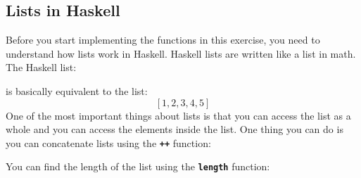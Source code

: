 \subsection{Lists in
Haskell}\label{lab-exercise-3-higher-order-functions.md__lists-in-haskell}

Before you start implementing the functions in this exercise, you need
to understand how lists work in Haskell. Haskell lists are written like
a list in math. The Haskell list:

\begin{Shaded}
\begin{Highlighting}[]
\NormalTok{[}\NormalTok{,}\NormalTok{,}\NormalTok{,}\NormalTok{,}\NormalTok{]}
\end{Highlighting}
\end{Shaded}

is basically equivalent to the list: \[
[1,2,3,4,5]
\] One of the most important things about lists is that you can access
the list as a whole and you can access the elements inside the list. One
thing you can do is you can concatenate lists using the
\textbf{\texttt{++}} function:

\begin{Shaded}
\begin{Highlighting}[]
\OperatorTok{\textgreater{}}\NormalTok{ [}\NormalTok{,}\NormalTok{,}\NormalTok{,}\NormalTok{,}\NormalTok{] }\OperatorTok{++}\NormalTok{ [}\NormalTok{,}\NormalTok{,}\NormalTok{]}
\NormalTok{[}\NormalTok{,}\NormalTok{,}\NormalTok{,}\NormalTok{,}\NormalTok{,}\NormalTok{,}\NormalTok{,}\NormalTok{]}
\end{Highlighting}
\end{Shaded}

You can find the length of the list using the \textbf{\texttt{length}}
function:

\begin{Shaded}
\begin{Highlighting}[]
\OperatorTok{\textgreater{}} \NormalTok{ [}\NormalTok{,}\NormalTok{,}\NormalTok{,}\NormalTok{,}\NormalTok{]}
\end{Highlighting}
\end{Shaded}

